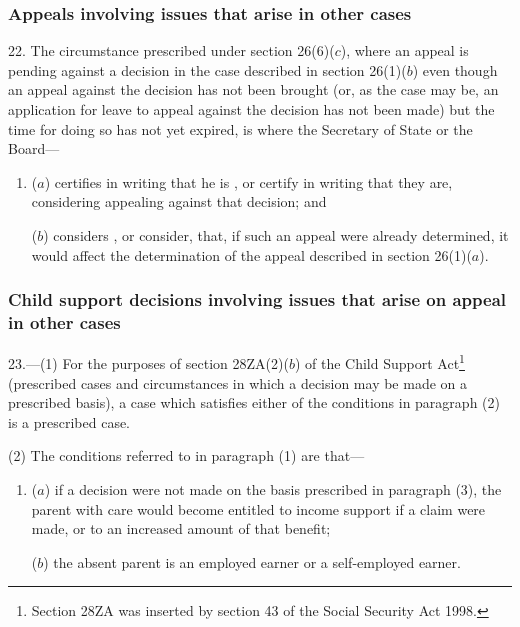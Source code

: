 \documentclass[12pt,a4paper]{article}
\begin{document}

\subsubsection[22. Appeals involving issues that arise in other cases]{Appeals involving issues that arise in other cases}

22.  The circumstance prescribed under section 26(6)($c$), where an appeal is pending against a decision in the case described in section 26(1)($b$) even though an appeal against the decision has not been brought (or, as the case may be, an application for leave to appeal against the decision has not been made) but the time for doing so has not yet expired, is where the Secretary of State
or the Board—  %
\begin{enumerate}\item[]
($a$) certifies in writing that he is%
, or certify in writing that they are,  %
considering appealing against that decision; and

($b$) considers%
, or consider,  %
that, if such an appeal were already determined, it would affect the determination of the appeal described in section 26(1)($a$).
\end{enumerate}


\subsubsection[23. Child support decisions involving issues that arise on appeal in other cases]{Child support decisions involving issues that arise on appeal in other cases}

23.—(1) For the purposes of section 28ZA(2)($b$) of the Child Support Act\footnote{\frenchspacing Section 28ZA was inserted by section 43 of the Social Security Act 1998.} (prescribed cases and circumstances in which a decision may be made on a prescribed basis), a case which satisfies either of the conditions in paragraph (2) is a prescribed case.

(2) The conditions referred to in paragraph (1) are that—
\begin{enumerate}\item[]
($a$) if a decision were not made on the basis prescribed in paragraph (3), the parent with care would become entitled to income support if a claim were made, or to an increased amount of that benefit;

($b$) the absent parent is an employed earner or a self-employed earner.
\end{enumerate}
\end{document}
